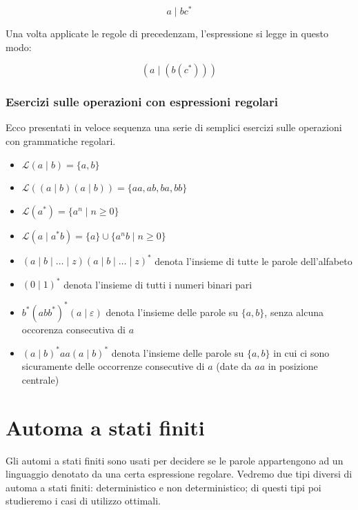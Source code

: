 \documentclass[class=book, crop=false, oneside, 12pt]{standalone}
\begin{document}
\begin{equation*}
    a \mid b c^\ast
\end{equation*}

\noindent Una volta applicate le regole di precedenzam, l'espressione si legge in questo modo:

\begin{equation*}
    (a \mid ( b  ( c^\ast ) ) )
\end{equation*}    

\subsubsection{Esercizi sulle operazioni con espressioni regolari}
Ecco presentati in veloce sequenza una serie di semplici esercizi sulle operazioni con grammatiche regolari. 

\begin{itemize}
    \item \(\mathcal{L}(a \mid b) = \{a, b\}\)
    \item \(\mathcal{L}((a \mid b) (a \mid b)) = \{aa, ab, ba, bb\}\)
    \item \(\mathcal{L}(a^*) = \{a^n \mid n \ge 0\}\)
    \item \(\mathcal{L}(a \mid a^\ast b) = \{a\} \cup \{a^n b \mid n \ge 0\}\)
    \item \( (a \mid b \mid \ldots \mid z)(a \mid b \mid \ldots \mid z)^\ast \) denota l’insieme di tutte le parole dell’alfabeto
    \item \( (0 \mid 1)^\ast \) denota l’insieme di tutti i numeri binari pari
    \item \( b^\ast (abb^\ast )^\ast ( a \mid \varepsilon ) \) denota l’insieme delle parole su \(\{a,b\} \), senza alcuna occorenza consecutiva di \(a\)
    \item \( (a \mid b)^\ast aa(a \mid b)^\ast \) denota l’insieme delle parole su \( \{a,b\} \) in cui ci sono sicuramente delle occorrenze consecutive di \(a\) (date da \(aa\) in posizione centrale)
\end{itemize}

\section{Automa a stati finiti}
Gli automi a stati finiti sono usati per decidere se le parole appartengono ad un linguaggio denotato da una certa espressione regolare.
Vedremo due tipi diversi di automa a stati finiti: deterministico e non deterministico; di questi tipi poi studieremo i casi di utilizzo ottimali.
\end{document}
